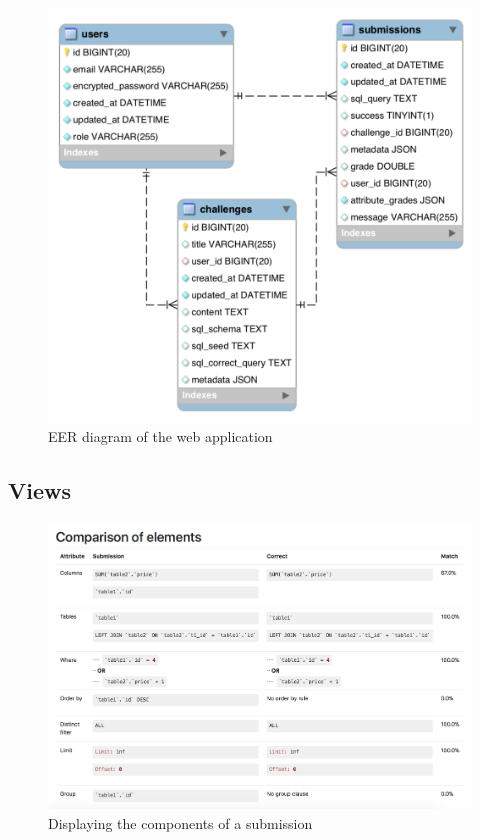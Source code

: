 \begin{figure}
    \centering
    \includegraphics[width=\textwidth/8*6]{Chapters/4-Design/database_schema.png}
    \caption{EER diagram of the web application}
\end{figure}

\subsection{Views}

\begin{figure}[H]
\centering
\includegraphics[width=\textwidth]{Chapters/4-Design/components.png}
\caption{Displaying the components of a submission}
\label{fig:design}
\end{figure}


